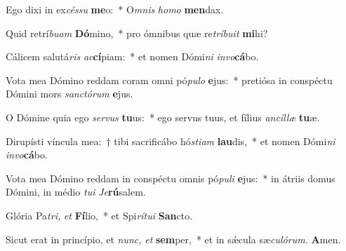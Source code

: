\item Ego dixi in ex\textit{céssu} \textbf{me}o:~* O\textit{mnis} \textit{homo} \textbf{men}dax.
\item Quid retrí\textit{buam} \textbf{Dó}mino,~* pro ómnibus quæ re\tinyhspace\textit{tríbuit} \textbf{mi}hi?
\item Cálicem salutá\textit{ris} \textit{ac}\textbf{cí}piam:~* et nomen Dómi\tinyhspace\textit{ni} \textit{invo}\textbf{cá}bo.
\item Vota mea Dómino reddam coram omni pó\textit{pulo} \textbf{e}jus:~* pretiósa in conspéctu Dómini mors \textit{sanctórum} \textbf{e}jus.
\item O Dómine quia ego \textit{servus} \textbf{tu}us:~* ego servus tuus, et fílius \textit{ancíllæ} \textbf{tu}æ.
\item Dirupísti víncula mea:~† tibi sacrificábo hó\textit{stiam} \textbf{lau}dis,~* et nomen Dómi\tinyhspace\textit{ni} \textit{invo}\textbf{cá}bo.
\item Vota mea Dómino reddam in conspéctu omnis pó\textit{puli} \textbf{e}jus:~* in átriis domus Dómini, in médio \textit{tui} \textit{Je}\textbf{rú}salem.
\item Glória Pa\tinyhspace\textit{tri,} \textit{et} \textbf{Fí}lio,~* et Spi\tinyhspace\textit{rítui} \textbf{San}cto.
\item Sicut erat in princípio, et \textit{nunc,} \textit{et} \textbf{sem}per,~* et in sǽcula sæ\tinyhspace\textit{culórum.} \textbf{A}men.